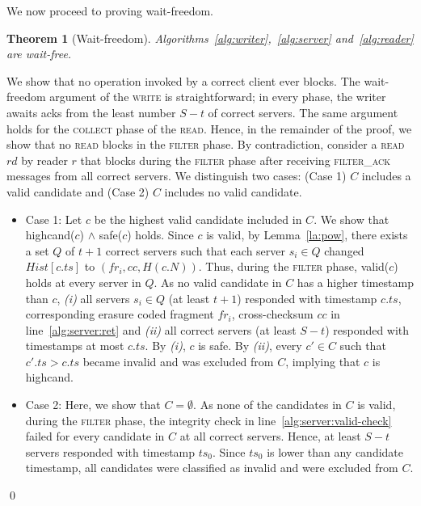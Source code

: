 \documentclass[10pt,conference,compsocconf]{IEEEtran}
\newtheorem{theo}[defn]{Theorem}
\newenvironment{prooff}{\vspace{1ex}\noindent{\bf Proof:}\hspace{0.5em}}
	{\hfill\qed\vspace{1em}}
\begin{document}
We now proceed to proving wait-freedom.
\begin{theo}[Wait-freedom] Algorithms~\ref{alg:writer},~\ref{alg:server} and~\ref{alg:reader} are wait-free.
\end{theo}
\begin{prooff} We show that no operation invoked by a correct client ever blocks. The wait-freedom argument of the \textsc{write} is straightforward; in every phase, the writer awaits acks from the least number $S-t$ of correct servers. The same argument holds for the \textsc{collect} phase of the \textsc{read}. Hence, in the remainder of the proof, we show that no \textsc{read} blocks in the \textsc{filter} phase. By contradiction, consider a \textsc{read} $rd$ by reader $r$ that blocks during the \textsc{filter} phase after receiving \textsc{filter\_ack} messages from all correct servers. We distinguish two cases: (Case 1) $C$ includes a valid candidate and (Case 2) $C$ includes no valid candidate.

\begin{itemize}
\item Case 1: Let $c$ be the highest valid candidate included in $C$. We show that \textsf{highcand}($c$) $\wedge$ \textsf{safe}($c$) holds. Since $c$ is valid, by Lemma~\ref{la:pow}, there exists a set $Q$ of $t+1$ correct servers such that each server $s_i \in Q$ changed $Hist[c.ts]$ to $(fr_i,cc,H(c.N))$. Thus, during the \textsc{filter} phase, \textsf{valid}($c$) holds at every server in $Q$. As no valid candidate in $C$ has a higher timestamp than $c$, \textit{(i)} all servers $s_i \in Q$ (at least $t+1$) responded with timestamp $c.ts$, corresponding erasure coded fragment $fr_i$, cross-checksum $cc$ in line~\ref{alg:server:ret} and \textit{(ii)} all correct servers (at least $S-t$) responded with timestamps at most $c.ts$. By \emph{(i)}, $c$ is \textsf{safe}. By \emph{(ii)}, every $c' \in C$ such that $c'.ts > c.ts$ became \textsf{invalid} and was excluded from $C$, implying that $c$ is \textsf{highcand}.

\item Case 2: Here, we show that $C = \emptyset$. As none of the candidates in $C$ is valid, during the \textsc{filter} phase, the integrity check in line~\ref{alg:server:valid-check} failed for every candidate in $C$ at all correct servers. Hence, at least $S-t$ servers responded with timestamp $ts_0$. Since $ts_0$ is lower than any candidate timestamp, all candidates were classified as \textsf{invalid} and were excluded from $C$.
\end{itemize}
\end{prooff}
\end{document}
